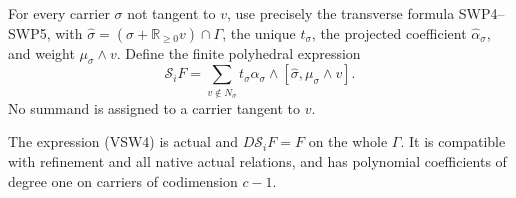 For every carrier $\sigma$ not tangent to $v$, use precisely
the transverse formula SWP4--SWP5, with
$\widehat\sigma=(\sigma+\mathbb R_{\ge0}v)\cap\Gamma$,
the unique $t_\sigma$, the projected coefficient
$\widehat\alpha_\sigma$, and weight $\mu_\sigma\wedge v$.
Define the finite polyhedral expression
\[
 \mathcal S_iF=
    \sum_{v\notin N_\sigma}
       t_\sigma\widehat\alpha_\sigma
                    \wedge[\widehat\sigma,\mu_\sigma\wedge v].
 \tag{VSW4}
\]
No summand is assigned to a carrier tangent to $v$.

\begin{lemma}
The expression (VSW4) is actual and $D\mathcal S_iF=F$ on
the whole $\Gamma$.  It is compatible with refinement and all
native actual relations, and has polynomial coefficients of degree
one on carriers of codimension $c-1$.
\end{lemma}

